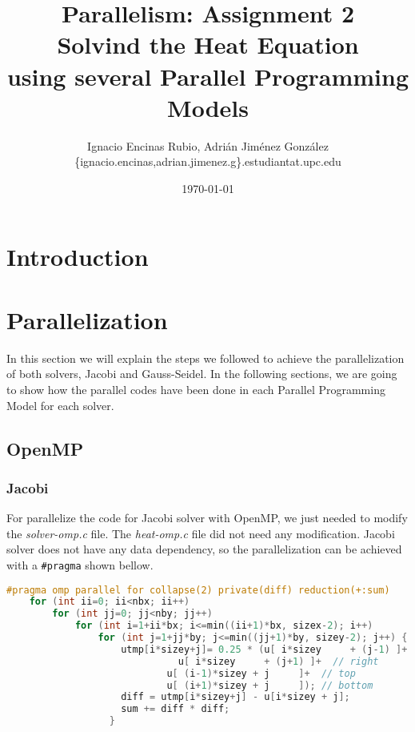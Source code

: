\documentclass[a4paper, 10pt]{article}
\title{\textbf{Parallelism: Assignment 2\\Solvind the Heat Equation \\using several Parallel Programming Models}}
\author{Ignacio Encinas Rubio, Adrián Jiménez González\\\{ignacio.encinas,adrian.jimenez.g\}.estudiantat.upc.edu}
\date{\normalsize\today{}}
\begin{document}
\maketitle

  
  

\section{Introduction}

\section{Parallelization}

In this section we will explain the steps we followed to achieve the parallelization of both solvers, Jacobi and Gauss-Seidel. In the following sections, we are going to show how the parallel codes have been done in each Parallel Programming Model for each solver.

\subsection{OpenMP}

\subsubsection{Jacobi}

  For parallelize the code for Jacobi solver with OpenMP, we just needed to modify the \textit{solver-omp.c} file. The \textit{heat-omp.c} file did not need any modification. Jacobi solver does not have any data dependency, so the parallelization can be achieved with a \texttt{\#pragma} shown bellow.

\begin{lstlisting}[language=c, caption={OpenMP pragma for Jacobi parallelization}]
    #pragma omp parallel for collapse(2) private(diff) reduction(+:sum)
    for (int ii=0; ii<nbx; ii++)
        for (int jj=0; jj<nby; jj++) 
            for (int i=1+ii*bx; i<=min((ii+1)*bx, sizex-2); i++) 
                for (int j=1+jj*by; j<=min((jj+1)*by, sizey-2); j++) {
	                utmp[i*sizey+j]= 0.25 * (u[ i*sizey     + (j-1) ]+  // left
					          u[ i*sizey     + (j+1) ]+  // right
				            u[ (i-1)*sizey + j     ]+  // top
				            u[ (i+1)*sizey + j     ]); // bottom
	                diff = utmp[i*sizey+j] - u[i*sizey + j];
	                sum += diff * diff; 
	              }
\end{lstlisting}
\end{document}
